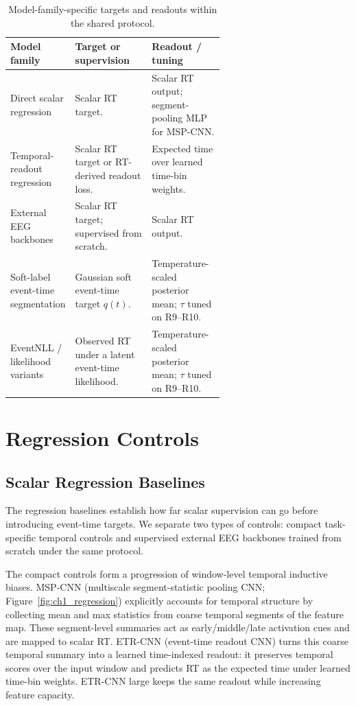 \documentclass[12pt]{article}
\begin{document}
\begin{table}[!t]
\centering
\caption{Model-family-specific targets and readouts within the shared protocol.}
\label{tab:shared_protocol_by_family}
\footnotesize
\setlength{\tabcolsep}{3pt}
\renewcommand{\arraystretch}{1.12}
\begin{tabularx}{\linewidth}{@{} >{\RaggedRight\arraybackslash}p{0.28\linewidth} >{\RaggedRight\arraybackslash}X >{\RaggedRight\arraybackslash}p{0.34\linewidth} @{}}
\toprule
\textbf{Model family} & \textbf{Target or supervision} & \textbf{Readout / tuning} \\
\midrule
Direct scalar regression & Scalar RT target. & Scalar RT output; segment-pooling MLP for MSP-CNN. \\
Temporal-readout regression & Scalar RT target or RT-derived readout loss. & Expected time over learned time-bin weights. \\
External EEG backbones & Scalar RT target; supervised from scratch. & Scalar RT output. \\
Soft-label event-time segmentation & Gaussian soft event-time target \(q(t)\). & Temperature-scaled posterior mean; \(\tau\) tuned on R9--R10. \\
EventNLL / likelihood variants & Observed RT under a latent event-time likelihood. & Temperature-scaled posterior mean; \(\tau\) tuned on R9--R10. \\
\bottomrule
\end{tabularx}
\end{table}

\section{Regression Controls}
\label{sec:regression_controls}

\subsection{Scalar Regression Baselines}

\label{sec:baseline_regression}

The regression baselines establish how far scalar supervision can go before introducing event-time targets. We separate two types of controls: compact task-specific temporal controls and supervised external EEG backbones trained from scratch under the same protocol.

The compact controls form a progression of window-level temporal inductive biases. MSP-CNN (multiscale segment-statistic pooling CNN; Figure~\ref{fig:ch1_regression}) explicitly accounts for temporal structure by collecting mean and max statistics from coarse temporal segments of the feature map. These segment-level summaries act as early/middle/late activation cues and are mapped to scalar RT. ETR-CNN (event-time readout CNN) turns this coarse temporal summary into a learned time-indexed readout: it preserves temporal scores over the input window and predicts RT as the expected time under learned time-bin weights. ETR-CNN large keeps the same readout while increasing feature capacity.
\end{document}
